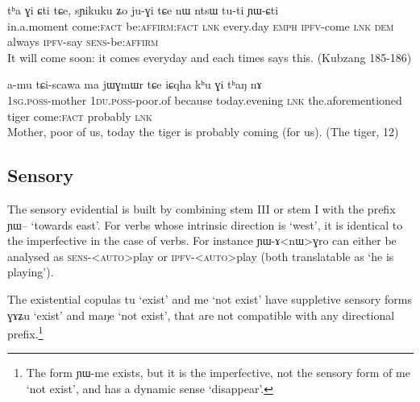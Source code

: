 \documentclass[oldfontcommands,oneside,a4paper,11pt]{article}
\newcommand{\ipa}[1]{{\phon \mbox{#1}}} %
\newcommand{\factual}[1]{\textsc{:fact}}
\begin{document}
\begin{exe}
\ex \label{ex:Gi.Cti}
\gll
 	\ipa{tʰa} 	\ipa{ɣi} 	\ipa{ɕti} 	\ipa{tɕe,} 	\ipa{sɲikuku} 	\ipa{ʑo} 	\ipa{ju-ɣi} 	\ipa{tɕe} 	\ipa{nɯ} 	\ipa{ntsɯ} 	\ipa{tu-ti} 	\ipa{ɲɯ-ɕti} 	\\
 in.a.moment come\factual{} be:\textsc{affirm}\factual{} \textsc{lnk} every.day \textsc{emph} \textsc{ipfv}-come \textsc{lnk} \textsc{dem} always \textsc{ipfv}-say \textsc{sens}-be:\textsc{affirm} \\
\glt It will come  soon: it comes everyday and each times says this. (Kubzang 185-186)
\end{exe}

\begin{exe}
\ex \label{ex:Gi.thaN}
\gll
 \ipa{a-mu} 	\ipa{tɕi-scawa} 	\ipa{ma} 	\ipa{jɯɣmɯr} 	\ipa{tɕe} 	\ipa{iɕqha} 	\ipa{kʰu} 	\ipa{ɣi} 	\ipa{tʰaŋ} 	\ipa{nɤ} 	\\
 \textsc{1sg.poss}-mother  \textsc{1du.poss}-poor.of because today.evening \textsc{lnk} the.aforementioned tiger  come\factual{} probably \textsc{lnk} \\
\glt Mother, poor of us, today the tiger is probably coming (for us). (The tiger, 12)
 \end{exe}

 

 
 \subsection{Sensory } \label{sec:sens}
The sensory evidential is built by combining stem III or stem I with the prefix \ipa{ɲɯ--} `towards east'.  For verbs whose intrinsic direction is `west', it is identical to the imperfective in the case of verbs. For instance \ipa{ɲɯ-ɤ<nɯ>ɣro} can either be analysed as \textsc{sens-<auto>}play or \textsc{ipfv-<auto>}play (both translatable as `he is playing').


The existential copulas \ipa{tu} `exist' and \ipa{me} `not exist' have suppletive sensory forms \ipa{ɣɤʑu} `exist'  and \ipa{maŋe} `not exist', that are not compatible with any directional prefix.\footnote{The form \ipa{ɲɯ-me} exists, but it is the imperfective, not the sensory form of \ipa{me} `not exist', and has a dynamic sense `disappear'. }
\end{document}
